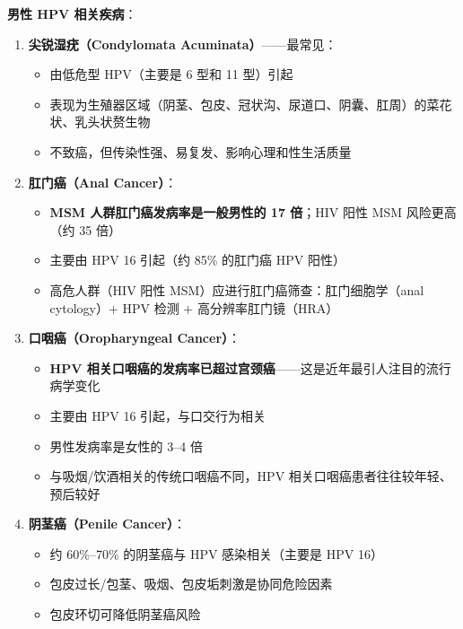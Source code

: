 \documentclass[12pt,a4paper,twoside]{ctexbook}
\begin{document}
\vspace{0.5em}
\noindent\textbf{男性 HPV 相关疾病}：

\begin{enumerate}
	\item \textbf{尖锐湿疣（Condylomata Acuminata）}——最常见：
	\begin{itemize}
		\item 由低危型 HPV（主要是 6 型和 11 型）引起
		\item 表现为生殖器区域（阴茎、包皮、冠状沟、尿道口、阴囊、肛周）的菜花状、乳头状赘生物
		\item 不致癌，但传染性强、易复发、影响心理和性生活质量
	\end{itemize}

	\item \textbf{肛门癌（Anal Cancer）}：
	\begin{itemize}
		\item \textbf{MSM 人群肛门癌发病率是一般男性的 17 倍}；HIV 阳性 MSM 风险更高（约 35 倍）
		\item 主要由 HPV 16 引起（约 85\% 的肛门癌 HPV 阳性）
		\item 高危人群（HIV 阳性 MSM）应进行肛门癌筛查：肛门细胞学（anal cytology）+ HPV 检测 + 高分辨率肛门镜（HRA）
	\end{itemize}

	\item \textbf{口咽癌（Oropharyngeal Cancer）}：
	\begin{itemize}
		\item \textbf{HPV 相关口咽癌的发病率已超过宫颈癌}——这是近年最引人注目的流行病学变化
		\item 主要由 HPV 16 引起，与口交行为相关
		\item 男性发病率是女性的 3--4 倍
		\item 与吸烟/饮酒相关的传统口咽癌不同，HPV 相关口咽癌患者往往较年轻、预后较好
	\end{itemize}

	\item \textbf{阴茎癌（Penile Cancer）}：
	\begin{itemize}
		\item 约 60\%--70\% 的阴茎癌与 HPV 感染相关（主要是 HPV 16）
		\item 包皮过长/包茎、吸烟、包皮垢刺激是协同危险因素
		\item 包皮环切可降低阴茎癌风险
	\end{itemize}
\end{enumerate}
\end{document}
